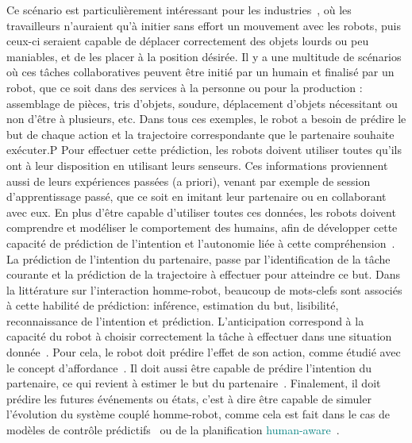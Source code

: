 \documentclass[utf8]{frontiersSCNS} %
\newcommand{\rev}[1]{\textcolor{blue}{#1}}
\newcommand{\ori}[1]{\textcolor{teal}{#1}}
\newcommand{\todo}[1]{\textcolor{red}{\textbf{/*#1*/}}}
\begin{document}
Ce scénario est particulièrement intéressant pour les industries~\citep{Dumora2013}, où les travailleurs n'auraient qu'à initier sans effort un mouvement avec les robots, puis ceux-ci seraient capable de déplacer correctement des objets lourds ou peu maniables, et de les placer à la position désirée. Il y a une multitude de scénarios où ces tâches collaboratives peuvent être initié par un humain et finalisé par un robot, que ce soit dans des services à la personne ou pour la production : assemblage de pièces, tris d'objets, soudure, déplacement d'objets nécessitant ou non d'être à plusieurs, etc. Dans tous ces exemples, le robot a besoin de prédire le but de chaque action et la trajectoire correspondante que le partenaire souhaite exécuter.P Pour effectuer cette prédiction, les robots doivent utiliser toutes qu'ils ont à leur disposition en utilisant leurs senseurs. Ces informations proviennent aussi de leurs expériences passées (a priori), venant par exemple de session d'apprentissage passé, que ce soit en imitant leur partenaire ou en collaborant avec eux. En plus d'être capable d'utiliser toutes ces données, les robots doivent comprendre et modéliser le comportement des humains, afin de développer cette capacité de prédiction de l'intention et l'autonomie liée à cette compréhension~\citep{Sato94}.
La prédiction de l'intention du partenaire, passe par l'identification de la tâche courante et la prédiction de la trajectoire à effectuer pour atteindre ce but.
Dans la littérature sur l'interaction homme-robot, beaucoup de mots-clefs sont associés à cette habilité de prédiction: inférence, estimation du but, lisibilité, reconnaissance de l'intention et prédiction.
L'anticipation correspond à la capacité du robot à choisir correctement la tâche à effectuer dans une situation donnée~\citep{Hoffman2010}. Pour cela, le robot doit prédire l'effet de son action, comme étudié avec le concept d'affordance~\citep{Ivaldi2014activeExplo,csahin2007afford,Jamone2017affordance}.  Il doit aussi être capable de prédire l'intention du partenaire, ce qui revient à estimer le but du partenaire~\citep{Wang2013ijrr,Thill2017hri}. Finalement, il doit prédire les futures événements ou états, c'est à dire être capable de simuler l'évolution du système couplé homme-robot, comme cela est fait dans le cas de modèles de contrôle prédictifs~\citep{Zube2016,Ivaldi2010} ou de la planification \ori{human-aware}~\citep{alami2006toward,shah2011improved}.
\end{document}
